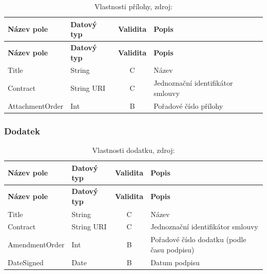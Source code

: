 \begin{center}
\begin{longtable}{lp{20mm}cp{65mm}}
\label{grid_mlmmh} \\
\multicolumn{1}{l}{\textbf{Název pole}} & 
\multicolumn{1}{l}{\textbf{Datový typ}} & 
\multicolumn{1}{l}{\textbf{Validita}} & 
\multicolumn{1}{l}{\textbf{Popis}} \\ \hline 
\endfirsthead
\multicolumn{1}{l}{\textbf{Název pole}} & 
\multicolumn{1}{l}{\textbf{Datový typ}} & 
\multicolumn{1}{l}{\textbf{Validita}} & 
\multicolumn{1}{l}{\textbf{Popis}} \\ \hline 
\hline
\endhead
\endfoot
\caption[Vlastnosti přílohy]{Vlastnosti přílohy, zdroj:\cite{metodika, standard}}
\endlastfoot
\rowcolor{validateC}Title & String & C & Název \\
\rowcolor{validateC}Contract & String URI & C & Jednoznační identifikátor smlouvy \\
\rowcolor{validateB}AttachmentOrder & Int & B & Pořadové číslo přílohy \\
\end{longtable}
\end{center}

\subsubsection*{Dodatek}

\begin{center}
\begin{longtable}{lp{20mm}cp{65mm}}
\label{grid_mlmmh} \\
\multicolumn{1}{l}{\textbf{Název pole}} & 
\multicolumn{1}{l}{\textbf{Datový typ}} & 
\multicolumn{1}{l}{\textbf{Validita}} & 
\multicolumn{1}{l}{\textbf{Popis}} \\ \hline 
\endfirsthead
\multicolumn{1}{l}{\textbf{Název pole}} & 
\multicolumn{1}{l}{\textbf{Datový typ}} & 
\multicolumn{1}{l}{\textbf{Validita}} & 
\multicolumn{1}{l}{\textbf{Popis}} \\ \hline 
\hline
\endhead
\endfoot
\caption[Vlastnosti dodatku]{Vlastnosti dodatku, zdroj:\cite{metodika, standard}}
\endlastfoot
\rowcolor{validateC}Title & String & C & Název \\
\rowcolor{validateC}Contract & String URI & C & Jednoznační identifikátor smlouvy \\
\rowcolor{validateB}AmendmentOrder & Int & B & Pořadové číslo dodatku (podle času podpisu) \\
\rowcolor{validateB}DateSigned & Date & B & Datum podpisu \\
\end{longtable}
\end{center}

